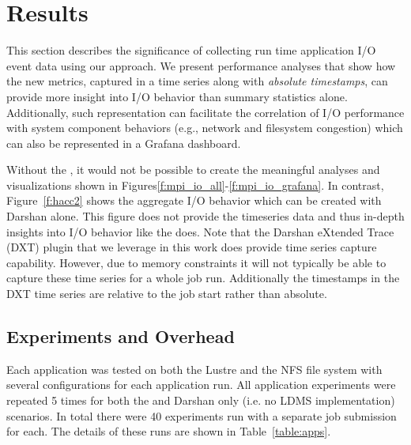 \section{Results}
\label{sec:results}

This section describes the significance of collecting
run time application I/O event data using our \Darshan{} approach. We present 
performance analyses that show how the new metrics, captured in a time series
along with \emph{absolute timestamps}, can provide more insight
into I/O behavior than summary statistics alone. 
Additionally, such representation
can facilitate the correlation of I/O performance with system component
behaviors
(e.g., network and filesystem congestion)
which can also be represented in a Grafana dashboard.

Without the \connector{}, it would not be possible to create the meaningful analyses 
and visualizations shown in Figures\ref{f:mpi_io_all}-\ref{f:mpi_io_grafana}. 
In contrast, Figure~\ref{f:hacc2} shows the aggregate I/O behavior which can be 
created with Darshan alone. This figure does not provide the timeseries data and 
thus in-depth insights into I/O behavior like the \Darshan{} does. Note that
the Darshan eXtended Trace (DXT) plugin that we leverage in this work does provide
time series capture capability. However, due to memory constraints it will not 
typically be able to capture these time series for a whole job run. Additionally
the timestamps in the DXT time series are relative to the job start rather than
absolute.


\subsection{Experiments and Overhead}
Each application was tested on both the Lustre and the NFS file system with 
several configurations for each application run. All application experiments 
were repeated 5 times for both the \connector{} and Darshan 
only (i.e. no LDMS implementation) scenarios. In total there were 40 experiments
run with a separate job submission for each. The details of these runs are shown 
in Table~\ref{table:apps}.  

